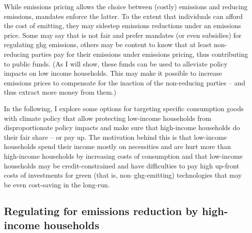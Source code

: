 \documentclass[referee, lineno, pdflatex,sn-apa]{sn-jnl}%
\theoremstyle{thmstyleone}%
\theoremstyle{thmstyletwo}%
\theoremstyle{thmstylethree}%
\begin{document}
While emissions pricing allows the choice between (costly) emissions and reducing emissions, mandates enforce the latter.
To the extent that individuals can afford the cost of emitting, they may sidestep emissions reductions under an emissions price.
Some may say that is not fair and prefer mandates (or even subsidies) for regulating \ac{ghg} emissions, others may be content to know that at least non-reducing parties pay for their emissions under emissions pricing, thus contributing to public funds.
(As I will show, these funds can be used to alleviate policy impacts on low income households.
This may make it possible to increase emissions prices to compensate for the inaction of the non-reducing parties -- and thus extract more money from them.)


In the following, I explore some options for targeting specific consumption goods with climate policy that allow protecting low-income households from disproportionate policy impacts and make sure that high-income households do their fair share -- or pay up.
The motivation behind this is that low-income households spend their income mostly on necessities and are hurt more than high-income households by increasing costs of consumption and that low-income households may be credit-constrained and have difficulties to pay high up-front costs of investments for green (that is, non--\ac{ghg}-emitting) technologies that may be even cost-saving in the long-run.

\subsection{Regulating for emissions reduction by high-income households}
\label{sec:rvp}
\end{document}
